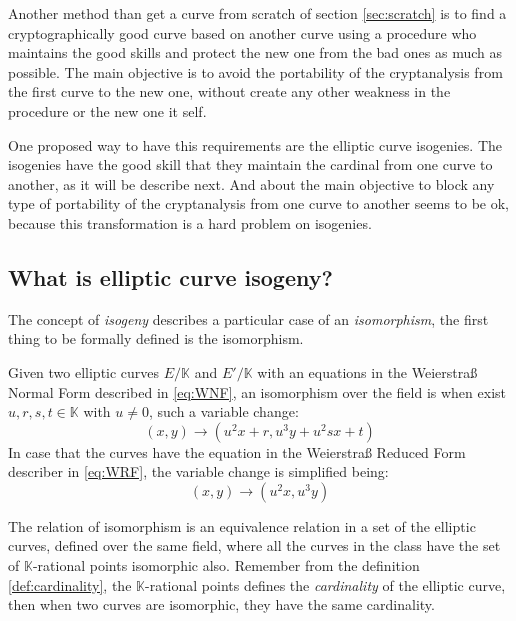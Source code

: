 \documentclass[10pt,a4paper,twoside]{llncs}
\begin{document}
Another method than get a curve from scratch of section \ref{sec:scratch} is to find a cryptographically good curve based on another curve using a procedure who maintains the good skills and protect the new one from the bad ones as much as possible. The main objective is to avoid the portability of the cryptanalysis from the first curve to the new one, without create any other weakness in the procedure or the new one it self.

One proposed way to have this requirements are the elliptic curve isogenies. The isogenies have the good skill that they maintain the cardinal from one curve to another, as it will be describe next. And about the main objective to block any type of portability of the cryptanalysis from one curve to another seems to be ok, because this transformation is a hard problem on isogenies.

\subsection{What is elliptic curve isogeny? \label{sec:isog}}

The concept of \emph{isogeny} describes a particular case of an \emph{isomorphism}, the first thing to be formally defined is the isomorphism.

\begin{definition}\label{def:isomorphism}
 Given two elliptic curves $E/\mathbb{K}$ and $E'/\mathbb{K}$ with an equations in the Weierstra\ss{} Normal Form described in \ref{eq:WNF}, an isomorphism over the field is when exist $u,r,s,t\in\mathbb{K}$ with $u\neq0$, such a variable change:
\begin{equation}\label{eq:isomorphisminWNF}
 (x,y) \rightarrow (u^2x+r,u^3y+u^2sx+t)
\end{equation}
In case that the curves have the equation in the Weierstra\ss{} Reduced Form describer in \ref{eq:WRF}, the variable change is simplified being:
\begin{equation}\label{eq:isomorphisminWRF}
 (x,y) \rightarrow (u^2x,u^3y)
\end{equation}
\end{definition}

The relation of isomorphism is an equivalence relation in a set of the elliptic curves, defined over the same field, where all the curves in the class have the set of $\mathbb{K}$-rational points isomorphic also. Remember from the definition \ref{def:cardinality}, the $\mathbb{K}$-rational points defines the \emph{cardinality} of the elliptic curve, then when two curves are isomorphic, they have the same cardinality.
\end{document}
